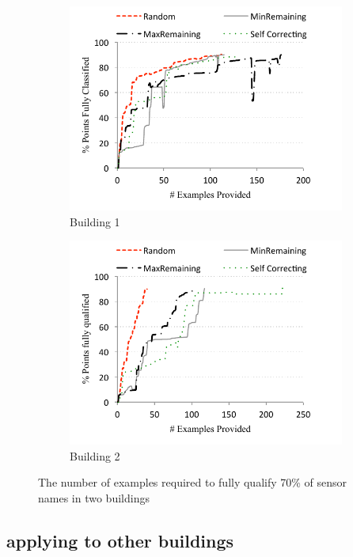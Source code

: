 \begin{figure}[h!]
\centering
	\begin{subfigure}{0.48\textwidth}
                \centering
		\includegraphics[width=\textwidth]{./figs/soda-active-learning.pdf}
                \caption{Building 1}
                \label{fig:active-learning-soda}
	\end{subfigure}
	\begin{subfigure}{0.48\textwidth}
                \centering
		\includegraphics[width=\textwidth]{./figs/sdh-active-learning.pdf}
                \caption{Building 2}
                \label{fig:active-learning-sdh}
	\end{subfigure}
\caption{The number of examples required to fully qualify 70\% of sensor names in two buildings}
\label{fig:active-learning}
\end{figure}



\subsection{applying to other buildings}







